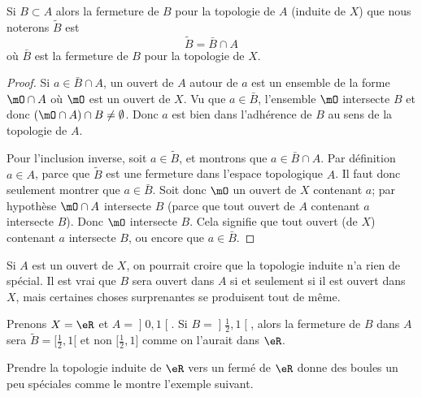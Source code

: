 \begin{lemma}       \label{LemkUYkQt}
    Si \( B\subset A\) alors la fermeture de \( B\) pour la topologie de \( A\) (induite de \( X\)) que nous noterons \( \tilde B\) est
    \begin{equation}
        \tilde B=\bar B\cap A
    \end{equation}
    où \( \bar B\) est la fermeture de \( B\) pour la topologie de \( X\).
\end{lemma}

\begin{proof}
    Si \( a\in \bar B\cap A\), un ouvert de \( A\) autour de \( a\) est un ensemble de la forme \( \mO\cap A\) où \( \mO\) est un ouvert de \( X\). Vu que \( a\in\bar B\), l'ensemble \( \mO\) intersecte \( B\) et donc \( (\mO\cap A)\cap B\neq \emptyset\). Donc \( a\) est bien dans l'adhérence de \( B\) au sens de la topologie de \( A\).

    Pour l'inclusion inverse, soit \( a\in \tilde  B\), et montrons que \( a\in \bar B\cap A\). Par définition \( a\in A\), parce que \( \tilde B\) est une fermeture dans l'espace topologique \( A\). Il faut donc seulement montrer que \( a\in\bar B\). Soit donc \( \mO\) un ouvert de \( X\) contenant \( a\); par hypothèse \( \mO\cap A\) intersecte \( B\) (parce que tout ouvert de \( A\) contenant \( a\) intersecte \( B\)). Donc \( \mO\) intersecte \( B\). Cela signifie que tout ouvert (de \( X\)) contenant \( a\) intersecte \( B\), ou encore que \( a\in \bar B\).
\end{proof}

Si \( A\) est un ouvert de \( X\), on pourrait croire que la topologie induite n'a rien de spécial. Il est vrai que \( B\) sera ouvert dans \( A\) si et seulement si il est ouvert dans \( X\), mais certaines choses surprenantes se produisent tout de même.

\begin{example} \label{ExloeyoR}
Prenons \( X=\eR\) et \( A=\mathopen] 0 , 1 \mathclose[\). Si \( B=\mathopen] \frac{ 1 }{2} , 1 \mathclose[ \), alors la fermeture de \( B\) dans \( A\) sera \( \tilde B=\mathopen[ \frac{ 1 }{2} , 1 [\) et non \( \mathopen[ \frac{ 1 }{2} , 1 \mathclose]\) comme on l'aurait dans \( \eR\).
\end{example}

Prendre la topologie induite de \( \eR\) vers un fermé de \( \eR\) donne des boules un peu spéciales comme le montre l'exemple suivant.

